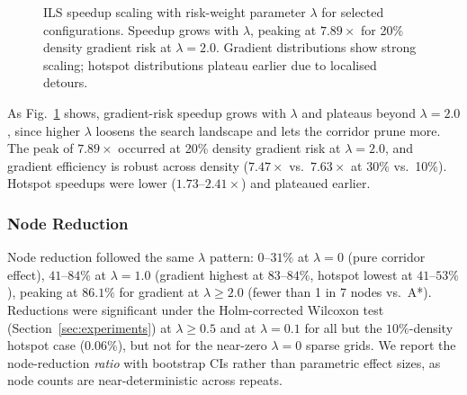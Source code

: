 \documentclass[preprint,12pt,authoryear]{elsarticle}
\begin{document}
\begin{figure}[!htbp]
\centering
{}
\caption{ILS speedup scaling with risk-weight parameter $\lambda$ for selected configurations. Speedup grows with $\lambda$, peaking at $7.89\times$ for 20\% density gradient risk at $\lambda = 2.0$. Gradient distributions show strong scaling; hotspot distributions plateau earlier due to localised detours.}
\label{fig:speedup_lambda}
\end{figure}

As Fig.~\ref{fig:speedup_lambda} shows, gradient-risk speedup grows with $\lambda$ and plateaus beyond $\lambda = 2.0$, since higher $\lambda$ loosens the search landscape and lets the corridor prune more. The peak of $7.89\times$ occurred at 20\% density gradient risk at $\lambda = 2.0$, and gradient efficiency is robust across density ($7.47\times$ vs.\ $7.63\times$ at 30\% vs.\ 10\%). Hotspot speedups were lower ($1.73$--$2.41\times$) and plateaued earlier.

\subsubsection{Node Reduction}

Node reduction followed the same $\lambda$ pattern: $0$--$31\%$ at $\lambda = 0$ (pure corridor effect), $41$--$84\%$ at $\lambda = 1.0$ (gradient highest at $83$--$84\%$, hotspot lowest at $41$--$53\%$), peaking at $86.1\%$ for gradient at $\lambda \geq 2.0$ (fewer than 1 in 7 nodes vs.\ A*). Reductions were significant under the Holm-corrected Wilcoxon test (Section~\ref{sec:experiments}) at $\lambda \geq 0.5$ and at $\lambda = 0.1$ for all but the $10\%$-density hotspot case ($0.06\%$), but not for the near-zero $\lambda = 0$ sparse grids. We report the node-reduction \emph{ratio} with bootstrap CIs rather than parametric effect sizes, as node counts are near-deterministic across repeats.
\end{document}

